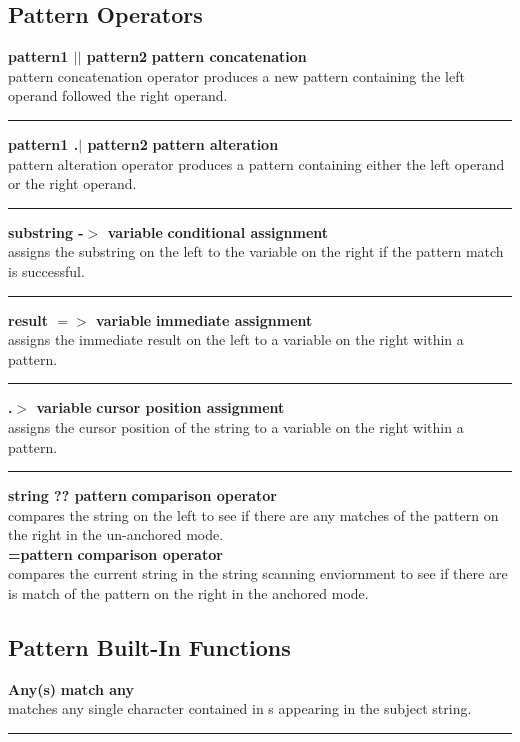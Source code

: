 \documentclass{article}
\begin{document}
\subsection*{Pattern Operators}
\noindent\textbf{pattern1 $\vert\vert$	pattern2} \hfill \textbf{pattern concatenation}\\
pattern concatenation operator produces a new pattern containing the left operand followed the right operand.\\
\noindent\rule{12cm}{0.4pt}

\noindent\textbf{pattern1 .$\vert$ pattern2} \hfill \textbf{pattern alteration}\\
pattern alteration operator produces a pattern containing either the left operand or the right operand.\\
\noindent\rule{12cm}{0.1pt}

\noindent\textbf{substring -$>$ variable} \hfill\textbf{conditional assignment}\\
assigns the substring on the left to the variable on the right if the pattern match is successful.\\
\noindent\rule{12cm}{0.1pt}

\noindent\textbf{result $=>$ variable} \hfill\textbf{immediate assignment}\\
assigns the immediate result on the left to a variable on the right within a pattern.\\
\noindent\rule{12cm}{0.1pt}

\noindent\textbf{.$>$ variable} \hfill\textbf{cursor position assignment}\\
assigns the cursor position of the string to a variable on the right within a pattern.\\
\noindent\rule{12cm}{0.1pt}

\noindent\textbf{string ?? pattern} \hfill\textbf{comparison operator}\\
compares the string on the left to see if there are any matches of the pattern on the right in the un-anchored mode.\\

\noindent\textbf{=pattern} \hfill\textbf{comparison operator}\\
compares the current string in the string scanning enviornment to see if there are is match of the pattern on the right in the anchored mode.\\

\subsection*{Pattern Built-In Functions}
\noindent\textbf{Any(s)} \hfill\textbf{match any}\\
matches any single character contained in s appearing in the subject string.\\
\noindent\rule{14cm}{0.1pt}
\end{document}
